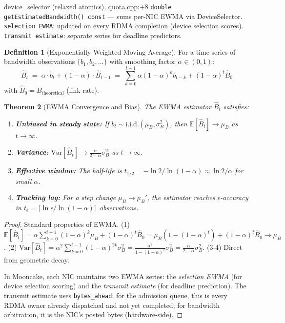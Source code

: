 \documentclass[11pt,a4paper,twoside]{article}
\theoremstyle{plain}
\newtheorem{theorem}{Theorem}[section]
\theoremstyle{definition}
\newtheorem{definition}[theorem]{Definition}
\theoremstyle{remark}
\newcommand{\Expect}{\mathbb{E}}
\begin{document}
\begin{codeline}{device\_selector (relaxed atomics), quota.cpp:+8}
\texttt{double getEstimatedBandwidth() const} --- sums per-NIC EWMA via DeviceSelector.\\
\texttt{selection EWMA}: updated on every RDMA completion (device selection scores).\\
\texttt{transmit estimate}: separate series for deadline predictors.
\end{codeline}

\begin{definition}[Exponentially Weighted Moving Average]
\label{def:ewma}
For a time series of bandwidth observations $\{b_1, b_2, \ldots\}$ with smoothing
factor $\alpha \in (0, 1)$:
\begin{equation}
  \hat{B}_t \;=\; \alpha \cdot b_t + (1 - \alpha) \cdot \hat{B}_{t-1}
  \;=\; \sum_{k=0}^{t-1} \alpha(1-\alpha)^k b_{t-k} + (1-\alpha)^t \hat{B}_0
\end{equation}
with $\hat{B}_0 = B_{\text{theoretical}}$ (link rate).
\end{definition}

\begin{theorem}[EWMA Convergence and Bias]
\label{thm:ewma}
The EWMA estimator $\hat{B}_t$ satisfies:
\begin{enumerate}[nosep]
  \item \textbf{Unbiased in steady state:} If $b_t \sim \text{i.i.d.}(\mu_B, \sigma_B^2)$,
    then $\Expect[\hat{B}_t] \to \mu_B$ as $t \to \infty$.
  \item \textbf{Variance:}
    $\text{Var}[\hat{B}_t] \to \frac{\alpha}{2-\alpha} \sigma_B^2$ as $t \to \infty$.
  \item \textbf{Effective window:} The half-life is
    $t_{1/2} = -\ln 2 / \ln(1-\alpha) \approx \ln 2 / \alpha$ for small $\alpha$.
  \item \textbf{Tracking lag:} For a step change $\mu_B \to \mu_B'$, the estimator
    reaches $\epsilon$-accuracy in
    $t_\epsilon = \lceil \ln \epsilon / \ln(1-\alpha) \rceil$ observations.
\end{enumerate}
\end{theorem}

\begin{proof}
Standard properties of EWMA.
(1) $\Expect[\hat{B}_t] = \alpha \sum_{k=0}^{t-1} (1-\alpha)^k \mu_B + (1-\alpha)^t \hat{B}_0
= \mu_B(1-(1-\alpha)^t) + (1-\alpha)^t \hat{B}_0 \to \mu_B$.
(2) $\text{Var}[\hat{B}_t] = \alpha^2 \sum_{k=0}^{t-1} (1-\alpha)^{2k} \sigma_B^2
= \frac{\alpha^2}{1-(1-\alpha)^2} \sigma_B^2 = \frac{\alpha}{2-\alpha} \sigma_B^2$.
(3-4) Direct from geometric decay.

In Mooncake, each NIC maintains two EWMA series:
the \textit{selection EWMA} (for device selection scoring) and the
\textit{transmit estimate} (for deadline prediction). The transmit estimate
uses \texttt{bytes\_ahead}: for the admission queue, this is every RDMA owner already
dispatched and not yet completed; for bandwidth arbitration, it is the NIC's posted
bytes (hardware-side).
\end{proof}
\end{document}
